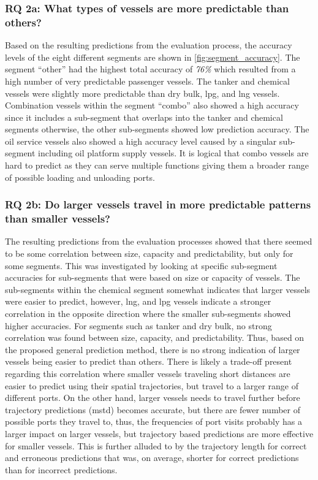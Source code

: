 \subsubsection{RQ 2a: What types of vessels are more predictable than others?}

Based on the resulting predictions from the evaluation process, the accuracy levels of the eight different segments are shown in \cref{fig:segment_accuracy}. The segment ``other'' had the highest total accuracy of \textit{76\%} which resulted from a high number of very predictable passenger vessels. The tanker and chemical vessels were slightly more predictable than dry bulk, \acrfull{lpg}, and \acrfull{lng} vessels. Combination vessels within the segment ``combo'' also showed a high accuracy since it includes a sub-segment that overlaps into the tanker and chemical segments otherwise, the other sub-segments showed low prediction accuracy. The oil service vessels also showed a high accuracy level caused by a singular sub-segment including oil platform supply vessels. It is logical that combo vessels are hard to predict as they can serve multiple functions giving them a broader range of possible loading and unloading ports.

\subsubsection{RQ 2b: Do larger vessels travel in more predictable patterns than smaller vessels?}

The resulting predictions from the evaluation processes showed that there seemed to be some correlation between size, capacity and predictability, but only for some segments. This was investigated by looking at specific sub-segment accuracies for sub-segments that were based on size or capacity of vessels. The sub-segments within the chemical segment somewhat indicates that larger vessels were easier to predict, however, \acrshort{lng}, and \acrshort{lpg} vessels indicate a stronger correlation in the opposite direction where the smaller sub-segments showed higher accuracies. For segments such as tanker and dry bulk, no strong correlation was found between size, capacity, and predictability. Thus, based on the proposed general prediction method, there is no strong indication of larger vessels being easier to predict than others. There is likely a trade-off present regarding this correlation where smaller vessels traveling short distances are easier to predict using their spatial trajectories, but travel to a larger range of different ports. On the other hand, larger vessels needs to travel further before trajectory predictions (\acrshort{mstd}) becomes accurate, but there are fewer number of possible ports they travel to, thus, the frequencies of port visits probably has a larger impact on larger vessels, but trajectory based predictions are more effective for smaller vessels. This is further alluded to by the trajectory length for correct and erroneous predictions that was, on average, shorter for correct predictions than for incorrect predictions.

